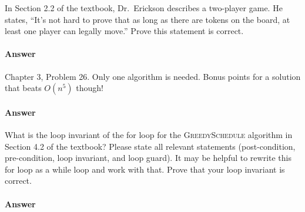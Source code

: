 \documentclass{article}
\begin{document}
In Section 2.2 of the textbook, Dr.~Erickson describes a two-player game.
He states, ``It's not hard to prove that
as long as there are tokens on the board, at least one player can legally
move.''  Prove this statement is correct.

\paragraph{Answer}

\todo{}


\collab{\todo{}}

Chapter 3, Problem 26.  Only one algorithm is needed. Bonus points for a
solution that beats $O(n^5)$ though!

\paragraph{Answer}

\todo{}

\collab{\todo{}}

What is the loop invariant of the for loop for the \textsc{GreedySchedule}
algorithm in Section 4.2 of the textbook?  Please state all relevant statements
(post-condition, pre-condition, loop invariant, and loop guard).  It may be
helpful to rewrite this for loop as a while loop and work with that.  Prove that
your loop invariant is correct.

\paragraph{Answer}

\todo{}
\end{document}
